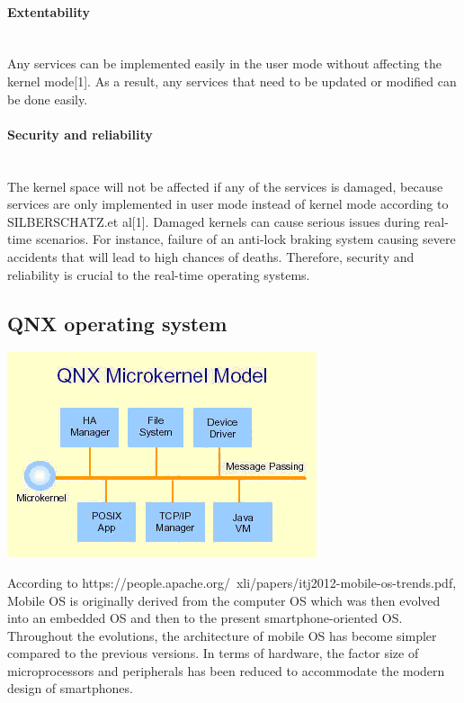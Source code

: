 \documentclass[conference]{IEEEtran}
\begin{document}
\paragraph{Extentability}\mbox{} \\
Any services can be implemented easily in the user mode without affecting the kernel mode[1]. As a result, any services that need to be updated or modified can be done easily.
\\
\paragraph{Security and reliability}\mbox{} \\
The kernel space will not be affected if any of the services is damaged, because services are only implemented in user mode instead of kernel mode according to SILBERSCHATZ.et al[1]. Damaged kernels can cause serious issues during real-time scenarios. For instance, failure of an anti-lock braking system causing severe accidents that will lead to high chances of deaths. Therefore, security and reliability is crucial to the real-time operating systems.

\subsection{QNX operating system}
\begin{center}
\includegraphics[scale=0.5]{./images/QNX_microkernel_mode.png}
\end{center}
According to https://people.apache.org/~xli/papers/itj2012-mobile-os-trends.pdf, Mobile OS is originally derived from the computer OS which was then evolved into an embedded OS and then to the present smartphone-oriented OS. Throughout the evolutions, the architecture of mobile OS has become simpler compared to the previous versions. In terms of hardware, the factor size of microprocessors and peripherals has been reduced to accommodate the modern design of smartphones. 
\end{document}
